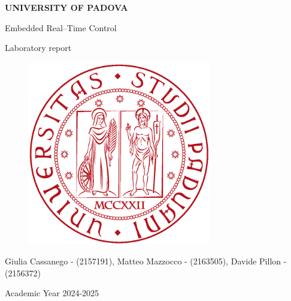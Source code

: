 \documentclass[english]{article}
\begin{document}
\begin{titlepage}

	\begin{center}
		\begin{Large} \textbf{UNIVERSITY OF PADOVA} \\
		\end{Large} \vspace{1cm}
		\vspace{3cm}
		\begin{Large} Embedded Real--Time Control \end{Large}
		\par\end{center}

	\begin{center}
		\begin{Large}Laboratory report\\
		\end{Large}
		\par\end{center}

	\begin{center}
		\vspace{2cm}
		\begin{figure}[!htb]
			\centering \includegraphics[width=8cm]{figures/unipd-logo.png}\\

		\end{figure}

		\par\end{center}

	\begin{center}
		\vspace{2cm}
		\begin{Large} Giulia Cassanego - (2157191), Matteo Mazzocco - (2163505), Davide Pillon - (2156372)  \\
		\end{Large} \vspace{2cm}
		\begin{Large} Academic Year 2024-2025 \end{Large}
		\par\end{center}

\end{titlepage}
\end{document}
